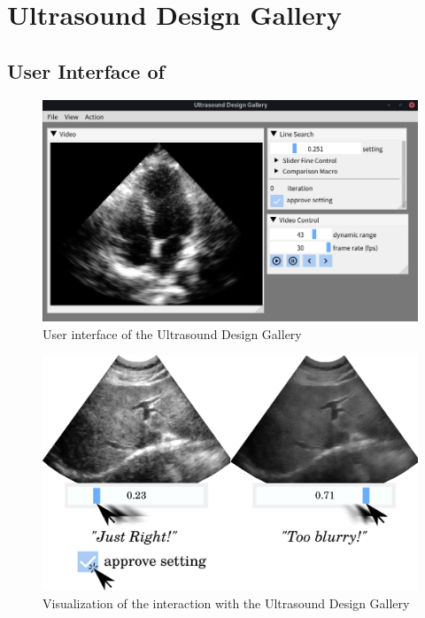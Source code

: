 
\section{Ultrasound Design Gallery}\label{section:method}

\subsection{User Interface of \usdg}\label{section:ui}

\begin{figure}[th]
  \centering
  \includegraphics[scale=0.35]{figures/ui.png}
  \caption{User interface of the Ultrasound Design Gallery}
\end{figure}

\begin{figure}[th]
  \centering
  \includegraphics[scale=0.35]{figures/ui_interaction.pdf}
  \caption{Visualization of the interaction with the Ultrasound Design Gallery}
\end{figure}


